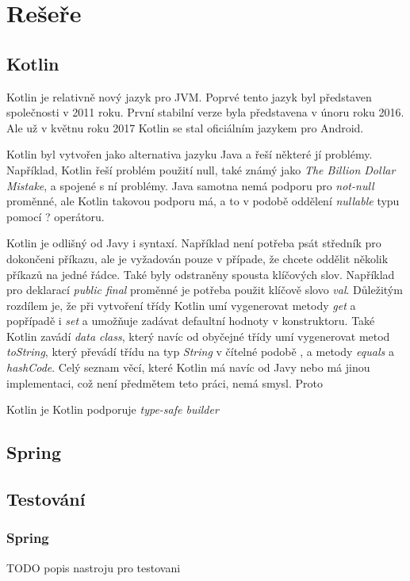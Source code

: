\chapter{Rešeře}\label{resere}
\section{Kotlin}\label{resere:kotlin}
    Kotlin je relativně nový jazyk pro JVM. Poprvé tento jazyk byl představen společnosti v 2011 roku. První stabilní verze byla představena v únoru roku 2016. Ale už v květnu roku 2017 Kotlin se stal oficiálním jazykem pro Android.
    
    Kotlin byl vytvořen jako alternativa jazyku Java a řeší některé jí problémy. Například, Kotlin řeší problém použití null, také známý jako \textit{The Billion Dollar Mistake}\cite{theBDM}, a spojené s ní problémy. Java samotna nemá podporu pro \textit{not-null} proměnné, ale Kotlin takovou podporu má, a to v podobě oddělení \textit{nullable} typu pomocí ? operátoru.
    
    Kotlin je odlišný od Javy i syntaxí. Například není potřeba psát středník pro dokončeni příkazu, ale je vyžadován pouze v případe, že chcete oddělit několik příkazů na jedné řádce. Také byly odstraněny spousta klíčových slov. Například pro deklarací \textit{public final} proměnné je potřeba použit klíčově slovo \textit{val}. Důležitým rozdílem je, že při vytvoření třídy Kotlin umí vygenerovat metody \textit{get} a popřípadě i \textit{set} a umožňuje zadávat defaultní hodnoty v konstruktoru. Také Kotlin zavádí \textit{data class}, který navíc od obyčejné třídy umí vygenerovat metod \textit{toString}, který převádí třídu na typ \textit{String} v čítelné podobě \cite{Priklad vygenerovane tridy}, a metody \textit{equals} a \textit{hashCode}. Celý seznam věcí, které Kotlin má navíc od Javy nebo má jinou implementaci, což není předmětem teto práci, nemá smysl. Proto 
    
    
    Kotlin je Kotlin podporuje \textit{type-safe builder}
\section{Spring}\label{resere:j2ee}
    
\section{Testování}\label{resere:testovani}
    \subsection{Spring}
    TODO popis nastroju pro testovani
